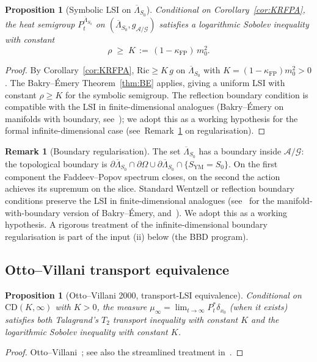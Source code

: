 \documentclass[11pt,a4paper]{amsart}
\newtheorem{proposition}[theorem]{Proposition}
\theoremstyle{definition}
\newtheorem{remark}[theorem]{Remark}
\newcommand{\Ric}{\mathrm{Ric}}
\newcommand{\kFP}{\kappa_{\mathrm{FP}}}
\begin{document}
\begin{proposition}[Symbolic LSI on $\overline\Lambda_{S_0}$]\label{prop:LSI-Lambda}
Conditional on Corollary~\ref{cor:KRFPA}, the heat semigroup
$P_t^{\overline\Lambda_{S_0}}$ on $(\overline\Lambda_{S_0},
g_{\mathcal A/\mathcal G})$ satisfies a logarithmic Sobolev inequality
with constant
$$
\rho \;\geq\; K \,:=\, (1-\kFP)\,m_0^2.
$$
\end{proposition}
\begin{proof}
By Corollary~\ref{cor:KRFPA}, $\Ric \geq K\,g$ on $\overline\Lambda_{S_0}$
with $K = (1-\kFP) m_0^2 > 0$. The Bakry--\'Emery
Theorem~\ref{thm:BE} applies, giving a uniform LSI with constant $\rho \geq K$
for the symbolic semigroup. The reflection boundary condition is compatible
with the LSI in finite-dimensional analogues (Bakry--\'Emery on manifolds
with boundary, see~\cite{Wang2014}); we adopt this as a working hypothesis
for the formal infinite-dimensional case
(see~Remark~\ref{rem:boundary} on regularisation).
\end{proof}

\begin{remark}[Boundary regularisation]\label{rem:boundary}
The set $\overline\Lambda_{S_0}$ has a boundary inside $\mathcal A/\mathcal G$:
the topological boundary is $\partial\overline\Lambda_{S_0}\cap
\partial\Omega \cup \partial\overline\Lambda_{S_0}\cap\{S_\mathrm{YM} = S_0\}$.
On the first component the Faddeev--Popov spectrum closes, on the second
the action achieves its supremum on the slice. Standard Wentzell or reflection
boundary conditions preserve the LSI in finite-dimensional analogues
(see~\cite{Wang2014} for the manifold-with-boundary version of
Bakry--\'Emery, and~\cite[Sec.~5]{BakryGentilLedoux2014}). We adopt this as a
working hypothesis. A rigorous treatment of the infinite-dimensional boundary
regularisation is part of the input (ii) below (the BBD program).
\end{remark}

\subsection{Otto--Villani transport equivalence}

\begin{proposition}[Otto--Villani 2000, transport-LSI equivalence]
\label{prop:OV}
Conditional on $\mathrm{CD}(K,\infty)$ with $K > 0$, the measure $\mu_\infty
= \lim_{t\to\infty} P_t^*\delta_{x_0}$ (when it exists) satisfies
both Talagrand's $T_2$ transport inequality with constant $K$ and the
logarithmic Sobolev inequality with constant $K$.
\end{proposition}
\begin{proof}
Otto--Villani~\cite{OttoVillani2000}; see also the streamlined treatment
in~\cite[Sec.~3]{BakryGentilLedoux2014}.
\end{proof}
\end{document}
